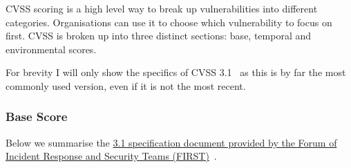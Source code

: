 \documentclass[12pt]{article}
\begin{document}
CVSS scoring is a high level way to break up vulnerabilities into different categories.
Organisations can use it to choose which vulnerability to focus on first. CVSS is broken up into
three distinct sections: base, temporal and environmental scores.

For brevity I will only show the specifics of CVSS 3.1~\cite{CVSS_31} as this is by far the most commonly used
version, even if it is not the most recent.

\subsubsection{Base Score}

Below we summarise the
\href{https://www.first.org/cvss/v3.1/specification-document}{3.1 specification document
	provided by the  Forum of Incident Response and Security Teams (FIRST)}~\cite{CVSS_31}.
\end{document}
